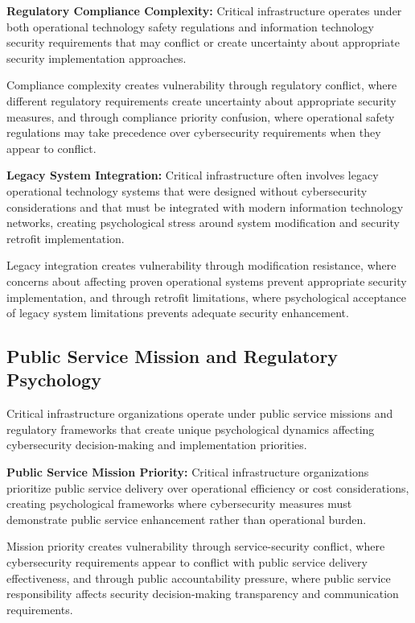 \documentclass[10pt, twocolumn]{article}
\begin{document}
\textbf{Regulatory Compliance Complexity:} Critical infrastructure operates under both operational technology safety regulations and information technology security requirements that may conflict or create uncertainty about appropriate security implementation approaches.

Compliance complexity creates vulnerability through regulatory conflict, where different regulatory requirements create uncertainty about appropriate security measures, and through compliance priority confusion, where operational safety regulations may take precedence over cybersecurity requirements when they appear to conflict.

\textbf{Legacy System Integration:} Critical infrastructure often involves legacy operational technology systems that were designed without cybersecurity considerations and that must be integrated with modern information technology networks, creating psychological stress around system modification and security retrofit implementation.

Legacy integration creates vulnerability through modification resistance, where concerns about affecting proven operational systems prevent appropriate security implementation, and through retrofit limitations, where psychological acceptance of legacy system limitations prevents adequate security enhancement.

\subsection{Public Service Mission and Regulatory Psychology}

Critical infrastructure organizations operate under public service missions and regulatory frameworks that create unique psychological dynamics affecting cybersecurity decision-making and implementation priorities.

\textbf{Public Service Mission Priority:} Critical infrastructure organizations prioritize public service delivery over operational efficiency or cost considerations, creating psychological frameworks where cybersecurity measures must demonstrate public service enhancement rather than operational burden.

Mission priority creates vulnerability through service-security conflict, where cybersecurity requirements appear to conflict with public service delivery effectiveness, and through public accountability pressure, where public service responsibility affects security decision-making transparency and communication requirements.
\end{document}
